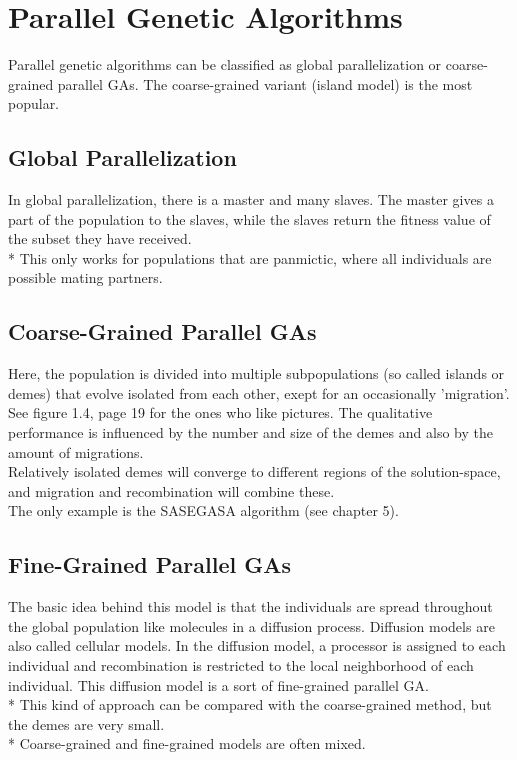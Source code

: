 \documentclass[12pt]{book}
\begin{document}
\section{Parallel Genetic Algorithms}
Parallel genetic algorithms can be classified as global parallelization or coarse-grained parallel GAs. The coarse-grained variant (island model) is the most popular.
\subsection{Global Parallelization}
In global parallelization, there is a master and many slaves. The master gives a part of the population to the slaves, while the slaves return the fitness value of the subset they have received.\\*
This only works for populations that are panmictic, where all individuals are possible mating partners.
\subsection{Coarse-Grained Parallel GAs}
Here, the population is divided into multiple subpopulations (so called islands or demes) that evolve isolated from each other, exept for an occasionally 'migration'. See figure 1.4, page 19 for the ones who like pictures. The qualitative performance is influenced by the number and size of the demes and also by the amount of migrations.\\
Relatively isolated demes will converge to different regions of the solution-space, and migration and recombination will combine these.\\ The only example is the SASEGASA algorithm (see chapter 5).
\subsection{Fine-Grained Parallel GAs}
The basic idea behind this model is that the individuals are spread throughout the global population like molecules in a diffusion process. Diffusion models are also called cellular models. In the diffusion model, a processor is assigned to each individual and recombination is restricted to the local neighborhood of each individual. This diffusion model is a sort of fine-grained parallel GA.\\*
This kind of approach can be compared with the coarse-grained method, but the demes are very small.\\*
Coarse-grained and fine-grained models are often mixed.
\end{document}
